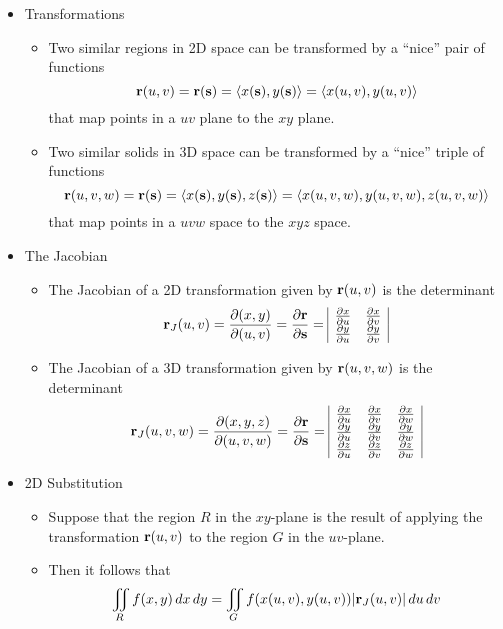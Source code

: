   \begin{itemize}
  
  \item Transformations
  
    \begin{itemize}
    \item Two similar regions in 2D space can be transformed by a ``nice'' pair of functions \[\mathbf{r}(u,v) = \mathbf{r}(\mathbf{s}) = \left<x(\mathbf{s}),y(\mathbf{s})\right> = \left<x(u,v),y(u,v)\right>\] that map points in a $uv$ plane to the $xy$ plane.
    \item Two similar solids in 3D space can be transformed by a ``nice'' triple of functions \[\mathbf{r}(u,v,w) = \mathbf{r}(\mathbf{s}) = \left<x(\mathbf{s}),y(\mathbf{s}),z(\mathbf{s})\right> = \left<x(u,v,w),y(u,v,w),z(u,v,w)\right>\] that map points in a $uvw$ space to the $xyz$ space.
    \end{itemize}
  
  \item The Jacobian
  
    \begin{itemize}
    \item The Jacobian of a 2D transformation given by $\mathbf{r}(u,v)$ is the determinant
\[
\mathbf{r}_J(u,v) = \frac{\partial (x,y)}{\partial (u,v)} = \frac{\partial\mathbf{r}}{\partial\mathbf{s}} =
\begin{array}{|c c|}
\frac{\partial x}{\partial u} & \frac{\partial x}{\partial v} \\
\frac{\partial y}{\partial u} & \frac{\partial y}{\partial v} \\
\end{array}
\]
    \item The Jacobian of a 3D transformation given by $\mathbf{r}(u,v,w)$ is the determinant
\[
\mathbf{r}_J(u,v,w) = \frac{\partial (x,y,z)}{\partial (u,v,w)} = \frac{\partial\mathbf{r}}{\partial\mathbf{s}} =
\begin{array}{|c c c|}
\frac{\partial x}{\partial u} & \frac{\partial x}{\partial v} & \frac{\partial x}{\partial w} \\
\frac{\partial y}{\partial u} & \frac{\partial y}{\partial v} & \frac{\partial y}{\partial w} \\
\frac{\partial z}{\partial u} & \frac{\partial z}{\partial v} & \frac{\partial z}{\partial w} \\
\end{array}
\]
    \end{itemize}
    
  \item 2D Substitution
  
    \begin{itemize}
    \item Suppose that the region $R$ in the $xy$-plane is the result of applying the transformation $\mathbf{r}(u,v)$ to the region $G$ in the $uv$-plane.
    \item Then it follows that \[\iint\limits_R f(x,y)\,dx\,dy = \iint\limits_G f(x(u,v),y(u,v))|\mathbf{r}_J(u,v)|\,du\,dv\]
    \end{itemize}


\end{itemize}
